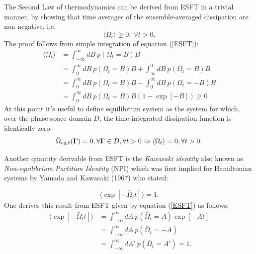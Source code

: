 \documentclass[a4paper,12pt]{article}
\begin{document}
The Second Law of thermodynamics can be derived from ESFT in a trivial manner, by showing that time averages of the ensemble-averaged dissipation are non negative, i.e.
\begin{equation}
  \langle\Omega_t\rangle\geq 0,\  \forall t > 0.
\end{equation}
 The proof follows from simple integration of equation (\ref{ESFT}):
\begin{equation}
\begin{aligned}
  \langle \Omega_t \rangle &= \int_{-\infty}^{\infty} dB\ p(\Omega_t=B)B\\
  &=\int_0^{\infty} dB\ p(\Omega_t=B)B +\int_{\infty}^{0} dB\ p(\Omega_t=B)B \\
  &=\int_0^{\infty} dB\ p(\Omega_t=B)B -\int_{0}^{\infty} dB\ p(\Omega_t=-B)B \\
  &= \int_0^{\infty} dB\ p(\Omega_t=B)B(1-\exp[-B]) \geq 0 
\end{aligned}
\end{equation} 
At this point it's useful to define equilibrium system as the system for which, over the phase space domain $D$, the time-integrated dissipation function is identically zero:
\begin{equation}
  \bar{\Omega}_{eq,t}(\bm{\Gamma})=0, \forall\bm{\Gamma}\in  D, \forall t >0 \\
  \Rightarrow \langle \Omega_t \rangle = 0, \forall t > 0.
\end{equation}

Another quantity derivable from ESFT is the \textit{Kawasaki identity} also known as \textit{Non-equilibrium Partition Identity} (NPI) which was first implied for Hamiltonian systems by Yamada and Kawasaki (1967) \cite{Yamada:1967uo} who stated:

\begin{equation}
  \langle \exp[-\bar{\Omega}_t t] \rangle =1.
\end{equation}
One derives this result from ESFT given by equation (\ref{ESFT}) as follows:
\begin{equation}
\begin{aligned}
  \langle \exp[-\bar{\Omega}_t t] \rangle &= \int_{-\infty}^{\infty} dA\ p(\bar{\Omega}_t=A)\exp[-A t]\\
  &=\int_{-\infty}^{\infty} dA\ p(\bar{\Omega}_t=-A)\\
  &=\int_{-\infty}^{\infty} dA'\ p(\bar{\Omega}_t=A')=1.
\end{aligned}
\end{equation}
\end{document}

